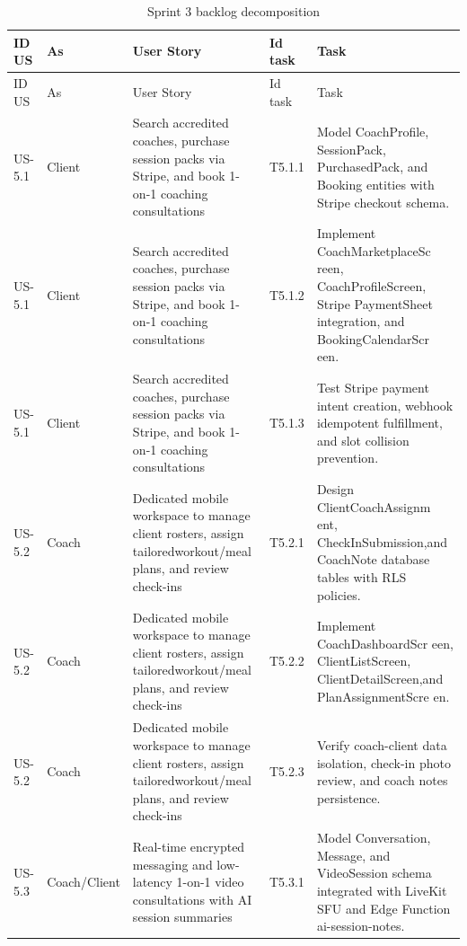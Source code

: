 \documentclass[12pt,a4paper,openany]{report}
\begin{document}
\begingroup
\scriptsize
\setlength{\tabcolsep}{3pt}
\renewcommand{\arraystretch}{1.20}
\setlength{\LTpre}{5pt}
\setlength{\LTpost}{10pt}
\begin{longtable}{|L{1.20cm}|L{2.00cm}|L{5.40cm}|L{1.80cm}|L{4.00cm}|}
\caption{Sprint 3 backlog decomposition}\label{tab:pdf-66-31} \\
\hline
{}
ID US & As & User Story & Id task & Task \\ \hline
\endfirsthead
\hline
{}
ID US & As & User Story & Id task & Task \\ \hline
\endhead
US-5.1 & Client & Search accredited coaches, purchase session packs via Stripe, and book 1-on-1 coaching consultations & T5.1.1 & Model CoachProfile, SessionPack, PurchasedPack, and Booking entities with Stripe checkout schema. \\ \hline
US-5.1 & Client & Search accredited coaches, purchase session packs via Stripe, and book 1-on-1 coaching consultations & T5.1.2 & Implement CoachMarketplaceSc reen, CoachProfileScreen, Stripe PaymentSheet integration, and BookingCalendarScr een. \\ \hline
US-5.1 & Client & Search accredited coaches, purchase session packs via Stripe, and book 1-on-1 coaching consultations & T5.1.3 & Test Stripe payment intent creation, webhook idempotent fulfillment, and slot collision prevention. \\ \hline
US-5.2 & Coach & Dedicated mobile workspace to manage client rosters, assign tailoredworkout/meal plans, and review check-ins & T5.2.1 & Design ClientCoachAssignm ent, CheckInSubmission,and CoachNote database tables with RLS policies. \\ \hline
US-5.2 & Coach & Dedicated mobile workspace to manage client rosters, assign tailoredworkout/meal plans, and review check-ins & T5.2.2 & Implement CoachDashboardScr een, ClientListScreen, ClientDetailScreen,and PlanAssignmentScre en. \\ \hline
US-5.2 & Coach & Dedicated mobile workspace to manage client rosters, assign tailoredworkout/meal plans, and review check-ins & T5.2.3 & Verify coach-client data isolation, check-in photo review, and coach notes persistence. \\ \hline
US-5.3 & Coach/Client & Real-time encrypted messaging and low-latency 1-on-1 video consultations with AI session summaries & T5.3.1 & Model Conversation, Message, and VideoSession schema integrated with LiveKit SFU and Edge Function ai-session-notes. \\ \hline

\end{longtable}
\end{document}
